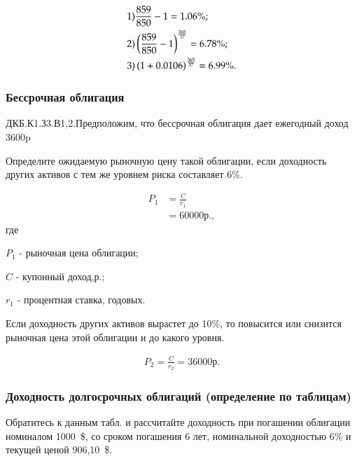 \documentclass[12pt, table, a4paper,twoside]{exam}
\begin{document}
\begin{questions}
\begin{solution}[12em]
	\begin{align*}
	&1)\space \frac{859}{850} - 1 = 1.06\%;\\
	&2)\space \left(\frac{859}{850} - 1 \right)^{\frac{365}{57}}=6.78\%;\\
	&3)\space \left(1+ 0.0106 \right)^{\frac{365}{57}}=6.99\%.
	\end{align*}
\end{solution}

\subsubsection{Бессрочная облигация}
\question[10] ДКБ.К1.З3.В1,2.Предположим, что бессрочная облигация дает ежегодный доход 3600p
\noaddpoints
\begin{subparts}
	\subpart[5] Определите ожидаемую рыночную цену такой облигации, если доходность других активов с тем же уровнем риска составляет 6\%.
	
	\begin{solution}[12em]
		\begin{align}
		P_1&=\frac{C}{r_1}\\
		&=60000\text{р.},\nonumber
		\end{align}	
		где
		
		$P_1$ - рыночная цена облигации;
		
		$C$ - купонный доход,р.;
		
		$r_1$ - процентная ставка, годовых.
	\end{solution}
	
	\subpart[5] Если доходность других активов вырастет до 10\%, то повысится или снизится рыночная цена этой облигации и до какого уровня.
	
	\begin{solution}[12em]
		\begin{align*}
		P_2=\frac{C}{r_2}=36000\text{р.}
		\end{align*}	
		
	\end{solution}
\end{subparts}
\addpoints

\subsubsection{Доходность долгосрочных облигаций (определение по таблицам)}
\question[10] Обратитесь к данным табл. и рассчитайте доходность при погашении облигации номиналом 1000~\$, со сроком погашения 6 лет, номинальной доходностью 6\% и текущей ценой 906,10~\$.


\end{questions}
\end{document}
